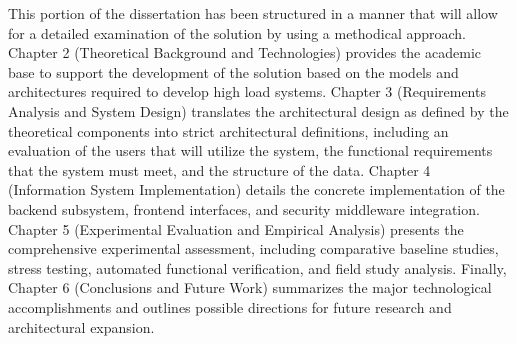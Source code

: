 This portion of the dissertation has been structured in a manner that will allow for a detailed examination of the solution by using a methodical approach. Chapter 2 (Theoretical Background and Technologies) provides the academic base to support the development of the solution based on the models and architectures required to develop high load systems. Chapter 3 (Requirements Analysis and System Design) translates the architectural design as defined by the theoretical components into strict architectural definitions, including an evaluation of the users that will utilize the system, the functional requirements that the system must meet, and the structure of the data. Chapter 4 (Information System Implementation) details the concrete implementation of the backend subsystem, frontend interfaces, and security middleware integration. Chapter 5 (Experimental Evaluation and Empirical Analysis) presents the comprehensive experimental assessment, including comparative baseline studies, stress testing, automated functional verification, and field study analysis. Finally, Chapter 6 (Conclusions and Future Work) summarizes the major technological accomplishments and outlines possible directions for future research and architectural expansion.